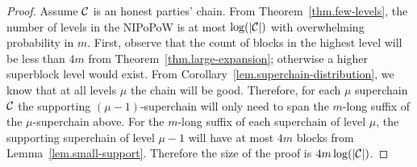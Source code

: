 \begin{proof}
    Assume $\mathcal{C}$ is an honest parties' chain. From
    Theorem~\ref{thm.few-levels}, the number of levels in the NIPoPoW is at most
    $\log(|\mathcal{C}|)$ with overwhelming probability in $m$. First, observe that
    the count of blocks in the highest level will be less than $4m$ from
    Theorem~\ref{thm.large-expansion}; otherwise a higher superblock level would
    exist. From Corollary~\ref{lem.superchain-distribution}, we know that at all
    levels $\mu$ the chain will be good. Therefore, for each $\mu$ superchain
    $\mathcal{C}$ the supporting $(\mu - 1)$-superchain will only need to span the
    $m$-long suffix of the $\mu$-superchain above. For the $m$-long suffix of
    each superchain of level $\mu$, the supporting superchain of level $\mu - 1$
    will have at most $4m$ blocks from Lemma~\ref{lem.small-support}. Therefore
    the size of the proof is $4m \log(|\mathcal{C}|)$.
    \Qed
\end{proof}
